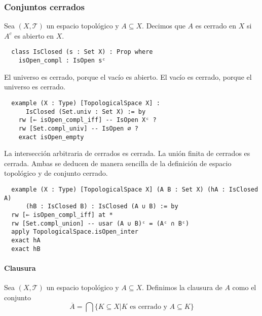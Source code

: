 \subsubsection{Conjuntos cerrados}

\begin{definition}
  Sea $(X, \mathcal{T})$ un espacio topológico y $A \subseteq X$. Decimos que $A$ es \textnormal{cerrado} en $X$ si $A^c$ es abierto en $X$.
\end{definition}

\begin{lstlisting}
  class IsClosed (s : Set X) : Prop where
    isOpen_compl : IsOpen sᶜ
\end{lstlisting}

\begin{example}
  El universo es cerrado, porque el vacío es abierto. El vacío es cerrado, porque el universo es cerrado.
\end{example}

\begin{lstlisting}
  example (X : Type) [TopologicalSpace X] :
      IsClosed (Set.univ : Set X) := by
    rw [← isOpen_compl_iff] -- IsOpen Xᶜ ?
    rw [Set.compl_univ] -- IsOpen ∅ ?
    exact isOpen_empty
\end{lstlisting}

\begin{example}
  La intersección arbitraria de cerrados es cerrada. La unión finita de cerrados es cerrada. Ambas se deducen de manera sencilla de la definición de espacio topológico y de conjunto cerrado.
\end{example}

\begin{lstlisting}
  example (X : Type) [TopologicalSpace X] (A B : Set X) (hA : IsClosed A)
      (hB : IsClosed B) : IsClosed (A ∪ B) := by
  rw [← isOpen_compl_iff] at *
  rw [Set.compl_union] -- usar (A ∪ B)ᶜ = (Aᶜ ∩ Bᶜ)
  apply TopologicalSpace.isOpen_inter
  exact hA
  exact hB
\end{lstlisting}


\paragraph{Clausura}

\begin{definition}
  Sea $(X, \mathcal{T})$ un espacio topológico y $A \subseteq X$. Definimos la \textnormal{clausura} de $A$ como el conjunto
  $$
  \overline{A} = \bigcap \{K \subseteq X | K \text{ es cerrado y } A \subseteq K\}
  $$
\end{definition}

